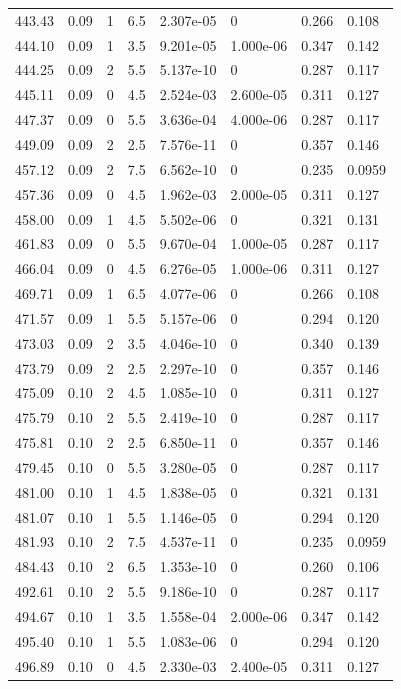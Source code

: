 \documentclass[preview]{standalone}
\begin{document}
{{{{{\begin{tabular}{L{1.2cm}C{1.2cm} C{0.3cm}C{0.5cm} C{1.4cm}C{1.4cm} C{1.4cm}C{1.4cm}}
  443.43  &  0.09  & 1     & 6.5 &  2.307e-05  & 0  & 0.266 &  0.108   \\ 
  444.10  &  0.09  & 1     & 3.5 &  9.201e-05  & 1.000e-06  & 0.347 &  0.142   \\ 
  444.25  &  0.09  & 2     & 5.5 &  5.137e-10  & 0  & 0.287 &  0.117   \\ 
  445.11  &  0.09  & 0     & 4.5 &  2.524e-03  & 2.600e-05  & 0.311 &  0.127   \\ 
  447.37  &  0.09  & 0     & 5.5 &  3.636e-04  & 4.000e-06  & 0.287 &  0.117   \\ 
  449.09  &  0.09  & 2     & 2.5 &  7.576e-11  & 0  & 0.357 &  0.146   \\ 
  457.12  &  0.09  & 2     & 7.5 &  6.562e-10  & 0  & 0.235 &  0.0959   \\ 
  457.36  &  0.09  & 0     & 4.5 &  1.962e-03  & 2.000e-05  & 0.311 &  0.127   \\ 
  458.00  &  0.09  & 1     & 4.5 &  5.502e-06  & 0  & 0.321 &  0.131   \\ 
  461.83  &  0.09  & 0     & 5.5 &  9.670e-04  & 1.000e-05  & 0.287 &  0.117   \\ 
  466.04  &  0.09  & 0     & 4.5 &  6.276e-05  & 1.000e-06  & 0.311 &  0.127   \\ 
  469.71  &  0.09  & 1     & 6.5 &  4.077e-06  & 0  & 0.266 &  0.108   \\ 
  471.57  &  0.09  & 1     & 5.5 &  5.157e-06  & 0  & 0.294 &  0.120   \\ 
  473.03  &  0.09  & 2     & 3.5 &  4.046e-10  & 0  & 0.340 &  0.139   \\ 
  473.79  &  0.09  & 2     & 2.5 &  2.297e-10  & 0  & 0.357 &  0.146   \\ 
  475.09  &  0.10  & 2     & 4.5 &  1.085e-10  & 0  & 0.311 &  0.127   \\ 
  475.79  &  0.10  & 2     & 5.5 &  2.419e-10  & 0  & 0.287 &  0.117   \\ 
  475.81  &  0.10  & 2     & 2.5 &  6.850e-11  & 0  & 0.357 &  0.146   \\ 
  479.45  &  0.10  & 0     & 5.5 &  3.280e-05  & 0  & 0.287 &  0.117   \\ 
  481.00  &  0.10  & 1     & 4.5 &  1.838e-05  & 0  & 0.321 &  0.131   \\ 
  481.07  &  0.10  & 1     & 5.5 &  1.146e-05  & 0  & 0.294 &  0.120   \\ 
  481.93  &  0.10  & 2     & 7.5 &  4.537e-11  & 0  & 0.235 &  0.0959   \\ 
  484.43  &  0.10  & 2     & 6.5 &  1.353e-10  & 0  & 0.260 &  0.106   \\ 
  492.61  &  0.10  & 2     & 5.5 &  9.186e-10  & 0  & 0.287 &  0.117   \\ 
  494.67  &  0.10  & 1     & 3.5 &  1.558e-04  & 2.000e-06  & 0.347 &  0.142   \\ 
  495.40  &  0.10  & 1     & 5.5 &  1.083e-06  & 0  & 0.294 &  0.120   \\ 
  496.89  &  0.10  & 0     & 4.5 &  2.330e-03  & 2.400e-05  & 0.311 &  0.127   \\ 
\hline 
\end{tabular} 

}}}}}
\end{document}

